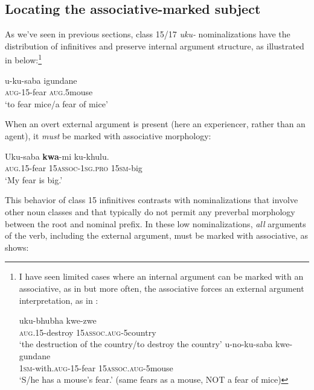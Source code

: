 \documentclass[output=paper,colorlinks,citecolor=brown]{langscibook}
\begin{document}
\subsection{Locating the associative-marked subject}\label{sec:halpert:3.1}

As we've seen in previous sections, class 15/17 \textit{uku-} nominalizations have the distribution of infinitives and preserve internal argument structure, as illustrated in  below:\footnote{I have seen limited cases where an internal argument can be marked with an associative, as in  but more often, the associative forces an external argument interpretation, as in :

\ea%
    \label{ex:halpert:fn1}
    \ea%
    \label{ex:halpert:fn1a}
    \gll    uku-bhubha kwe-zwe\\
            \textsc{aug}.15-destroy 15\textsc{assoc}.\textsc{aug}-5country\\
    \glt    `the destruction of the country/to destroy the country'
    \ex%
    \label{ex:halpert:fn1b}
    \gll    u-no-ku-saba kwe-gundane\\
            1\textsc{sm}-with.\textsc{aug}-15-fear 15\textsc{assoc}.\textsc{aug}-5mouse\\
    \glt    `S/he has a mouse's fear.' (same fears as a mouse, NOT a fear of mice)
    \z 
\z 
}

\ea%
    \label{ex:halpert:12} 
    \gll    u-ku-saba igundane\\
            \textsc{aug}-15-fear \textsc{aug}.5mouse\\
    \glt    `to fear mice/a fear of mice'
\z 

When an overt external argument is present (here an experiencer, rather than an agent), it \textit{must} be marked with associative morphology:

\ea%
    \label{ex:halpert:13}
    \gll    Uku-saba \textbf{kwa}-mi ku-khulu.\\
            \textsc{aug}.15-fear 15\textsc{assoc}-1\textsc{sg}.\textsc{pro} 15\textsc{sm}-big\\
    \glt    `My fear is big.'
\z 

This behavior of class 15 infinitives contrasts with nominalizations that involve other noun classes and that typically do not permit any preverbal morphology between the root and nominal prefix.  In these low nominalizations, \textit{all} arguments of the verb, including the external argument, must be marked with associative, as  shows:
\end{document}
